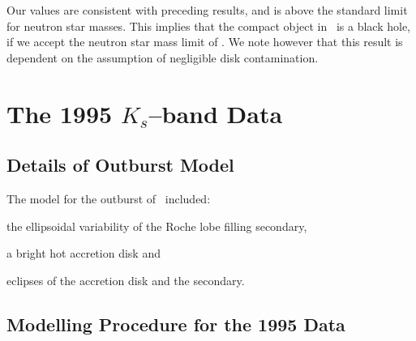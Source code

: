 \vspace{\myparskip}

Our values are consistent with preceding results, and is above the
standard limit for neutron star masses. This implies that the compact
object in \groj\ is a black hole, if we accept the neutron star mass limit of . We note however that this result is dependent on the assumption of negligible disk contamination. %


\section{The 1995 $K_s$--band Data}
\label{cha:ELC:sec:1995Results}


\subsection{Details of Outburst Model}
\label{cha:ELC:sec:1995Results:subsec:model}

The model for the outburst of \groj\ included:
\begin{inparaenum}[(i)]
\item
the ellipsoidal variability of the Roche lobe filling secondary,
\item
a bright hot accretion disk and
\item
eclipses of the accretion disk and the secondary.
\end{inparaenum}


\subsection{Modelling Procedure for the 1995 Data}
\label{cha:ELC:sec:1995Results:subsec:ModellingProcedure}


